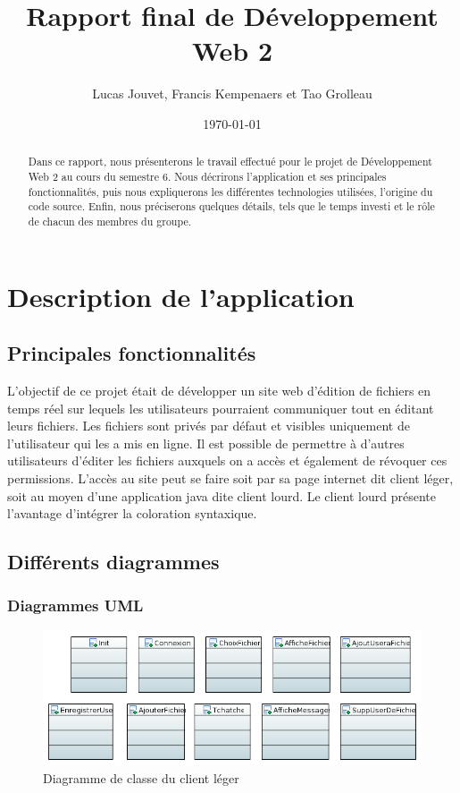 \documentclass[a4paper, 12pt]{article}
\title{Rapport final de Développement Web 2}
\author{Lucas Jouvet, Francis Kempenaers et Tao Grolleau}
\date{\today}
\begin{document}
\maketitle

\begin{abstract}
  Dans ce rapport, nous présenterons le travail effectué pour le projet de Développement Web 2 au cours du semestre 6. Nous décrirons l'application et ses principales fonctionnalités, puis nous expliquerons les différentes technologies utilisées, l'origine du code source. Enfin, nous préciserons quelques détails, tels que le temps investi et le rôle de chacun des membres du groupe.
\end{abstract}

\newpage

\section{Description de l'application}

\subsection{Principales fonctionnalités}

L'objectif de ce projet était de développer un site web d'édition de fichiers en temps réel sur lequels les utilisateurs pourraient communiquer tout en éditant leurs fichiers. Les fichiers sont privés par défaut et visibles uniquement de l'utilisateur qui les a mis en ligne. Il est possible de permettre à d'autres utilisateurs d'éditer les fichiers auxquels on a accès et également de révoquer ces permissions. L'accès au site peut se faire soit par sa page internet dit client léger, soit au moyen d'une application java dite client lourd. Le client lourd présente l'avantage d'intégrer la coloration syntaxique.

\subsection{Différents diagrammes}

\subsubsection{Diagrammes UML}

\begin{figure}[H]
  \begin{center}
    \includegraphics{DiagrammeClientLeger.PNG}
  \end{center}
  \caption{Diagramme de classe du client léger}
\end{figure}
\end{document}
